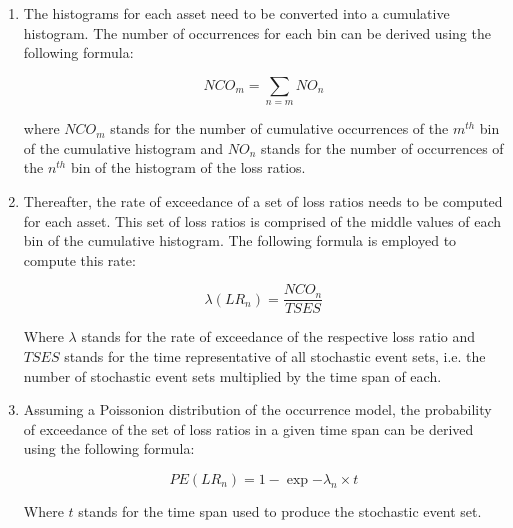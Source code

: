 \begin{enumerate}
\item The histograms for each asset need to be converted into a cumulative histogram. The number of occurrences for each bin can be derived using the following formula:

\begin{equation}
NCO_m = \sum_{n=m} NO_n
\end{equation}

where $NCO_m$ stands for the number of cumulative occurrences of the $m^{th}$ bin of the cumulative histogram and $NO_n$ stands for the number of occurrences of the $n^{th}$ bin of the histogram of the loss ratios.

\item Thereafter, the rate of exceedance of a set of loss ratios needs to be computed for each asset. This set of loss ratios is comprised of the middle values of each bin of the cumulative histogram. The following formula is employed to compute this rate:

\begin{equation}
\lambda(LR_n) = \frac{NCO_n}{TSES}
\end{equation}

Where $\lambda$ stands for the rate of exceedance of the respective loss ratio and $TSES$ stands for the time representative of all stochastic event sets, i.e. the number of stochastic event sets multiplied by the time span of each.

\item Assuming a Poissonion distribution of the occurrence model, the probability of exceedance of the set of loss ratios in a given time span can be derived using the following formula:

\begin{equation}
PE(LR_n) = 1-\exp{-\lambda_n\times t}
\end{equation}

Where $t$ stands for the time span used to produce the stochastic event set.

\end{enumerate}

